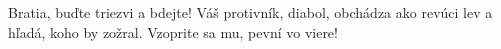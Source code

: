Bratia, buďte triezvi a bdejte! Váš protivník, diabol, obchádza ako revúci lev a hľadá, koho by zožral. Vzoprite sa mu, pevní vo viere!
